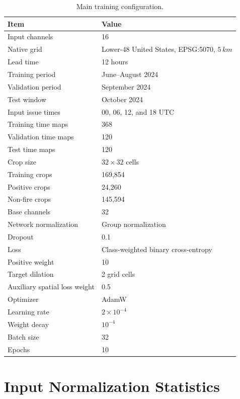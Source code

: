\documentclass[11pt]{article}
\newcommand{\grid}{5\,km}
\begin{document}
\begin{table}[h]
\centering
\small
\caption{Main training configuration.}
\label{tab:training_config}
\begin{tabular}{ll}
\toprule
Item & Value \\
\midrule
Input channels & 16 \\
Native grid & Lower-48 United States, EPSG:5070, \(\grid\) \\
Lead time & 12 hours \\
Training period & June--August 2024 \\
Validation period & September 2024 \\
Test window & October 2024 \\
Input issue times & 00, 06, 12, and 18 UTC \\
Training time maps & 368 \\
Validation time maps & 120 \\
Test time maps & 120 \\
Crop size & \(32\times32\) cells \\
Training crops & 169,854 \\
Positive crops & 24,260 \\
Non-fire crops & 145,594 \\
Base channels & 32 \\
Network normalization & Group normalization \\
Dropout & 0.1 \\
Loss & Class-weighted binary cross-entropy \\
Positive weight & 10 \\
Target dilation & 2 grid cells \\
Auxiliary spatial loss weight & 0.5 \\
Optimizer & AdamW \\
Learning rate & \(2\times10^{-4}\) \\
Weight decay & \(10^{-4}\) \\
Batch size & 32 \\
Epochs & 10 \\
\bottomrule
\end{tabular}
\end{table}

\section{Input Normalization Statistics}
\label{app:normalization}
\end{document}
